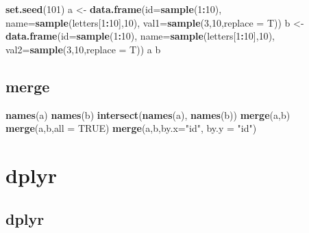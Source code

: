 \documentclass[]{article}
\newenvironment{Shaded}{\begin{snugshade}}{\end{snugshade}}
\newcommand{\KeywordTok}[1]{\textcolor[rgb]{0.13,0.29,0.53}{\textbf{#1}}}
\newcommand{\DataTypeTok}[1]{\textcolor[rgb]{0.13,0.29,0.53}{#1}}
\newcommand{\DecValTok}[1]{\textcolor[rgb]{0.00,0.00,0.81}{#1}}
\newcommand{\StringTok}[1]{\textcolor[rgb]{0.31,0.60,0.02}{#1}}
\newcommand{\OtherTok}[1]{\textcolor[rgb]{0.56,0.35,0.01}{#1}}
\newcommand{\OperatorTok}[1]{\textcolor[rgb]{0.81,0.36,0.00}{\textbf{#1}}}
\newcommand{\NormalTok}[1]{#1}
\begin{document}
\begin{Shaded}
\begin{Highlighting}[]
\KeywordTok{set.seed}\NormalTok{(}\DecValTok{101}\NormalTok{)}
\NormalTok{a <-}\StringTok{ }\KeywordTok{data.frame}\NormalTok{(}\DataTypeTok{id=}\KeywordTok{sample}\NormalTok{(}\DecValTok{1}\OperatorTok{:}\DecValTok{10}\NormalTok{), }\DataTypeTok{name=}\KeywordTok{sample}\NormalTok{(letters[}\DecValTok{1}\OperatorTok{:}\DecValTok{10}\NormalTok{],}\DecValTok{10}\NormalTok{), }\DataTypeTok{val1=}\KeywordTok{sample}\NormalTok{(}\DecValTok{3}\NormalTok{,}\DecValTok{10}\NormalTok{,}\DataTypeTok{replace =}\NormalTok{ T))}
\NormalTok{b <-}\StringTok{ }\KeywordTok{data.frame}\NormalTok{(}\DataTypeTok{id=}\KeywordTok{sample}\NormalTok{(}\DecValTok{1}\OperatorTok{:}\DecValTok{10}\NormalTok{), }\DataTypeTok{name=}\KeywordTok{sample}\NormalTok{(letters[}\DecValTok{1}\OperatorTok{:}\DecValTok{10}\NormalTok{],}\DecValTok{10}\NormalTok{), }\DataTypeTok{val2=}\KeywordTok{sample}\NormalTok{(}\DecValTok{3}\NormalTok{,}\DecValTok{10}\NormalTok{,}\DataTypeTok{replace =}\NormalTok{ T))}
\NormalTok{a}
\NormalTok{b}
\end{Highlighting}
\end{Shaded}

\subsection{merge}\label{merge-1}

\begin{Shaded}
\begin{Highlighting}[]
\KeywordTok{names}\NormalTok{(a)}
\KeywordTok{names}\NormalTok{(b)}
\KeywordTok{intersect}\NormalTok{(}\KeywordTok{names}\NormalTok{(a), }\KeywordTok{names}\NormalTok{(b))}
\KeywordTok{merge}\NormalTok{(a,b)}
\KeywordTok{merge}\NormalTok{(a,b,}\DataTypeTok{all =} \OtherTok{TRUE}\NormalTok{)}
\KeywordTok{merge}\NormalTok{(a,b,}\DataTypeTok{by.x=}\StringTok{"id"}\NormalTok{, }\DataTypeTok{by.y =} \StringTok{"id"}\NormalTok{)}
\end{Highlighting}
\end{Shaded}

\section{dplyr}\label{dplyr}

\subsection{dplyr}\label{dplyr-1}
\end{document}
